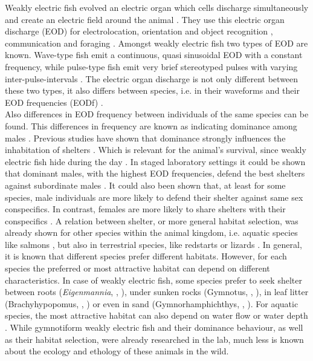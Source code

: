 Weakly electric fish evolved an electric organ which cells discharge simultaneously and create an electric field around the animal \citep{Zupanc_Bullock_2005}. They use this electric organ discharge (EOD) for electrolocation, orientation and object recognition \citep{Heiligenberg_73}, communication \citep{Hopkins_74} and foraging \citep{Nelson_MacIver_1999}. Amongst weakly electric fish two types of EOD are known. Wave-type fish emit a continuous, quasi sinusoidal EOD with a constant frequency, while pulse-type fish emit very brief stereotyped pulses with varying inter-pulse-intervals \citep{Zupanc_Bullock_2005}.
The electric organ discharge is 
not only different between these two types, it also differs between species, i.e. in their waveforms and their EOD frequencies (EODf) \citep{Zupanc_Bullock_2005}.\\
Also differences in EOD frequency between individuals of the same species can be found. This differences in frequency are known as indicating dominance among males \citep{HAGEDORN1985}.
Previous studies have shown that dominance strongly influences the inhabitation of shelters \citep{raab2019}.
Which is relevant for the animal's survival, since weakly electric fish hide during the day \citep{Hopkins_74}.     
In staged laboratory settings it could be shown that dominant males, with the highest EOD frequencies, defend the best shelters against subordinate males \citep{raab2019,dunlap2002retreat}.
It could also been shown that, at least for some species, male individuals are more likely to defend their shelter against same sex conspecifics. In contrast, females are more likely to share shelters with their conspecifics \citep{dunlap2002retreat}.
A relation between shelter, or more general habitat selection, was already shown for other species within the animal kingdom, i.e. aquatic species like salmons \citep{redsalmon1995}, but also in terrestrial species, like redstarts \citep{sherry1989redstarts} or lizards \citep{downes1998heat}.
In general, it is known that different species prefer different habitats. However, for each species the preferred or most attractive habitat can depend on different characteristics.
In case of weakly electric fish, some species prefer to seek shelter between roots (\textit{Eigenmannia}, \citeauthor{Hopkins_74}, \citeyear{Hopkins_74}), under sunken rocks (Gymnotus, \citeauthor{westby1988ecology}, \citeyear{westby1988ecology}), in leaf litter (Brachyhypopomus, \citeauthor{hagedorn1988ecology}, \citeyear{hagedorn1988ecology}) or even in sand (Gymnorhamphichthys, \citeauthor{lissmann1965activity}, \citeyear{lissmann1965activity}).
For aquatic species, the most attractive habitat can also depend on water flow or water depth \citep{aadland1993stream}.
While gymnotiform weakly electric fish and their dominance behaviour, as well as their habitat selection, were already researched in the lab, much less is known about the ecology and ethology of these animals in the wild.

